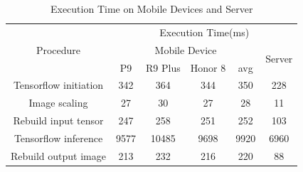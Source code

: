 \documentclass[a4paper,12pt,onecolumn,twoside]{article}
\begin{document}
\begin{CJK*}{GBK}{song}
    
    
    
    

\begin{table}[H]
  \centering
  \caption{Execution Time on Mobile Devices and Server}\label{tb:1}
  \begin{tabular}{|c|c|c|c|c|c|}
  \hline
  \multirow{3}{*}{Procedure} & \multicolumn{5}{c|}{Execution Time(ms)}                      \\ \cline{2-6} 
                             & \multicolumn{4}{c|}{Mobile Device} & \multirow{2}{*}{Server} \\ \cline{2-5}
                             & P9    & R9 Plus  & Honor 8  & avg  &                         \\ \hline
  Tensorflow initiation      & 342   & 364      & 344      & 350  & 228                     \\ \hline
  Image scaling              & 27    & 30       & 27       & 28   & 11                      \\ \hline
  Rebuild input tensor       & 247   & 258      & 251      & 252  & 103                     \\ \hline
  Tensorflow inference       & 9577  & 10485    & 9698     & 9920 & 6960                    \\ \hline
  Rebuild output image       & 213   & 232      & 216      & 220  & 88                      \\ \hline
  \end{tabular}
  \end{table}


\end{CJK*}
\end{document}
